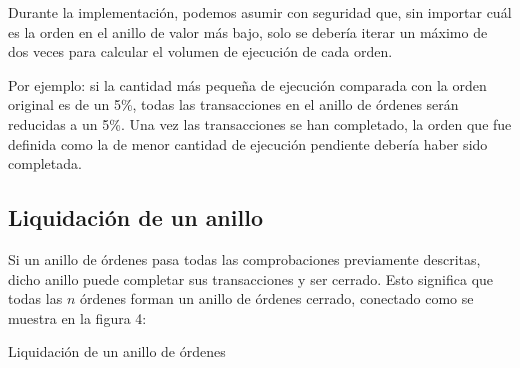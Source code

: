 \documentclass[UTF8,nofonts]{article}
\makeatletter
\newenvironment{figurehere}
 {\def\@captype{figure}}
 {}
\makeatother
\begin{document}
\begin{multicols}{2}
Durante la implementación, podemos asumir con seguridad que, sin importar cuál es la orden en el anillo de valor más bajo, solo se debería iterar un máximo de dos veces para calcular el volumen de ejecución de cada orden.

Por ejemplo: si la cantidad más pequeña de ejecución comparada con la orden original es de un 5\%, todas las transacciones en el anillo de órdenes serán reducidas a un 5\%. Una vez las transacciones se han completado, la orden que fue definida como la de menor cantidad de ejecución pendiente debería haber sido completada.

\subsection{Liquidación de un anillo\label{sec:settlement}}

Si un anillo de órdenes pasa todas las comprobaciones previamente descritas, dicho anillo puede completar sus transacciones y ser cerrado. Esto significa que todas las $n$ órdenes forman un anillo de órdenes cerrado, conectado como se muestra en la figura 4:

\begin{center}
\begin{figurehere}
\centering
{}
\caption{Liquidación de un anillo de órdenes}
\label{fig:settlement}
\end{figurehere}
\end{center}


\end{multicols}
\end{document}
